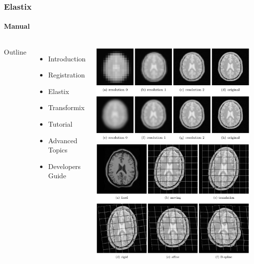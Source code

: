 \documentclass[xcolor=table,11pt]{beamer}
\begin{document}
	\begin{frame}
		\frametitle{Elastix}
		\framesubtitle{Manual}
		\begin{columns}
			Outline
			\begin{itemize}
				\item Introduction
				\item Registration
				\item Elastix
				\item Transformix
				\item Tutorial
				\item Advanced Topics
				\item Developers Guide
			\end{itemize}

			 \centering
			\includegraphics[width=0.8\linewidth]{Figures/Elastix1.png}\\
			\vfill
			\includegraphics[width=0.8\linewidth]{Figures/Elastix2.png}
		\end{columns}
	\end{frame}
	
	
\end{document}

